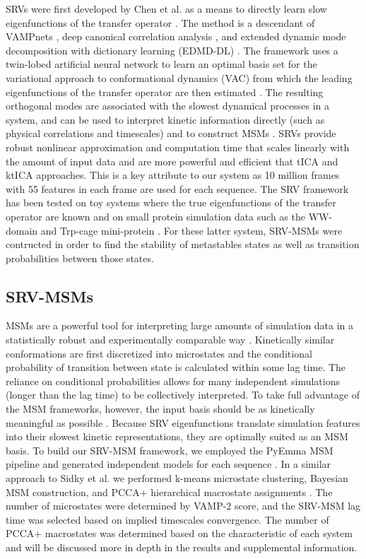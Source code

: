 \documentclass[journal=jpcbfk,manuscript=article]{achemso}
\begin{document}
SRVs were first developed by Chen et al. as a means to directly learn slow eigenfunctions of the transfer operator \citep{Chen}. The method is a descendant of VAMPnets \citep{Mardt2018VAMPnetsKinetics}, deep canonical correlation analysis \citep{Andrew2013DeepAnalysis}, and extended dynamic mode decomposition with dictionary learning (EDMD-DL) \citep{Li2017ExtendedOperator}. The framework uses a twin-lobed artificial neural network to learn an optimal basis set for the variational approach to conformational dynamics (VAC) from which the leading eigenfunctions of the transfer operator are then estimated \citep{Noe2013ASystems}. The resulting orthogonal modes are associated with the slowest dynamical processes in a system, and can be used to interpret kinetic information directly (such as physical correlations and timescales) and to construct MSMs \citep{Sidky, Pande2010EverythingAsk}. SRVs provide robust nonlinear approximation and computation time that scales linearly with the amount of input data and are more powerful and efficient that tICA and ktICA approaches. This is a key attribute to our system as 10 million frames with 55 features in each frame are used for each sequence. The SRV framework has been tested on toy systems where the true eigenfunctions of the transfer operator are known and on small protein simulation data such as the WW-domain and Trp-cage mini-protein \citep{Chen, Sidky}. For these latter system, SRV-MSMs were contructed in order to find the stability of metastables states as well as transition probabilities between those states.


\subsection{\label{sec:methods}SRV-MSMs}

MSMs are a powerful tool for interpreting large amounts of simulation data in a statistically robust and experimentally comparable way \citep{Phys2011MarkovValidation, Husic2018MarkovScience}. Kinetically similar conformations are first discretized into microstates and the conditional probability of transition between state is calculated within some lag time. The reliance on conditional probabilities allows for many independent simulations (longer than the lag time) to be collectively interpreted. To take full advantage of the MSM frameworks, however, the input basis should be as kinetically meaningful as possible \citep{Pande2010EverythingAsk}. Because SRV eigenfunctions translate simulation features into their slowest kinetic representations, they are optimally suited as an MSM basis. To build our SRV-MSM framework, we employed the PyEmma MSM pipeline and generated independent models for each sequence \citep{Scherer2015PyEMMAModels}. In a similar approach to Sidky et al. we performed k-means microstate clustering, Bayesian MSM construction, and PCCA+ hierarchical macrostate assignments \citep{Sidky}. The number of microstates were determined by VAMP-2 score, and the SRV-MSM lag time was selected based on implied timescales convergence.  The number of PCCA+ macrostates was determined based on the characteristic of each system and will be discussed more in depth in the results and supplemental information.
\end{document}
